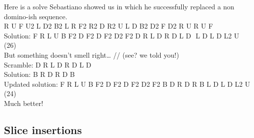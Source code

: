 \documentclass[11pt,a4paper]{book}
\newcommand{\p}{\textquotesingle}
\newcommand{\ps}{\p\,\,}
\newcommand{\comment}[1]{{\color{gray}\quad//#1}}
\begin{document}
\newline
Here is a solve Sebastiano showed us in which he successfully replaced a non domino-ish sequence.\\
\newline
R\ps U\ps F U2 L\ps D2 B2 L R F2 R2 D\ps R2 U\ps L\ps D\ps B2 D2 F\ps D2 R\ps U R\ps U\ps F \\
\newline
Solution: F R L U\ps B F2 D\ps F2 D F2 D2 F2 {D R\ps L D\ps R D L\ps D\ps} L\ps D L D L2 U (26) \\
But something doesn't smell right… \comment{ (see? we told you!)}\\
\newline
Scramble: {D R\ps L D\ps R D L\ps D\ps}\\
Solution: B R\ps D R D\ps B\ps\\
Updated solution: F R L U\ps B F2 D\ps F2 D F2 D2 F2 B D R\ps D\ps R B\ps L\ps D L D L2 U (24)\\
\newline
Much better!\\

\subsection{Slice insertions}
\end{document}
